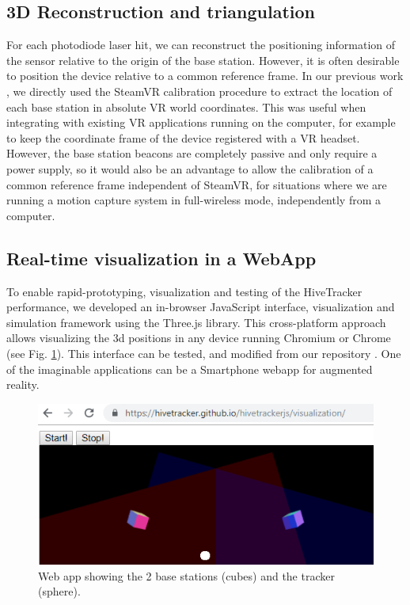 \documentclass[sigchi]{acmart}
\begin{document}
\subsection{3D Reconstruction and triangulation}

For each photodiode laser hit, we can reconstruct the positioning information of the sensor relative to the origin of the base station. However, it is often desirable to position the device relative to a common reference frame. In our previous work \cite{Quinones2018}, we directly used the SteamVR calibration procedure to extract the location of each base station in absolute VR world coordinates. This was useful when integrating with existing VR applications running on the computer, for example to keep the coordinate frame of the device registered with a VR headset. However, the base station beacons are completely passive and only require a power supply, so it would also be an advantage to allow the calibration of a common reference frame independent of SteamVR, for situations where we are running a motion capture system in full-wireless mode, independently from a computer.


\subsection{Real-time visualization in a WebApp}

To enable rapid-prototyping, visualization and testing of the HiveTracker performance, we developed an in-browser JavaScript interface, visualization and simulation framework using the Three.js library. This cross-platform approach allows visualizing the 3d positions in any device running Chromium or Chrome (see Fig. \ref{Fig:webapp}). This interface can be tested, and modified from our repository \cite{WebappRepo}.
One of the imaginable applications can be a Smartphone webapp for augmented reality.

\begin{figure}[h]
  \centering
  \includegraphics[width=\linewidth]{Figures/webapp.png}
  \caption{Web app showing the 2 base stations (cubes) and the tracker (sphere).}
  \label{Fig:webapp}
\end{figure}
\end{document}
